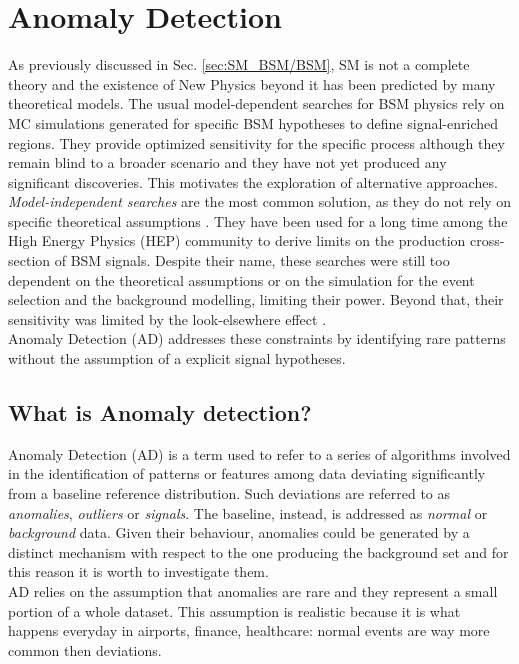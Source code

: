 \chapter{Anomaly Detection} \label{chap:AD}

As previously discussed in Sec. \ref{sec:SM_BSM/BSM}, SM is not a complete theory and the existence of New Physics beyond it has been predicted by many theoretical models.
The usual model-dependent searches for BSM physics rely on MC simulations generated for specific BSM hypotheses to define signal-enriched regions.
They provide optimized sensitivity for the specific process although they remain blind to a broader scenario and they have not yet produced any significant discoveries.
This motivates the exploration of alternative approaches.\\
\textit{Model-independent searches} are the most common solution, as they do not rely on specific theoretical assumptions \cite{LHCOlympics}. 
They have been used for a long time among the High Energy Physics (HEP) community to derive limits on the production cross-section of BSM signals. 
Despite their name, these searches were still too dependent on the theoretical assumptions or on the simulation for the event selection and the background modelling, limiting their power.
Beyond that, their sensitivity was limited by the look-elsewhere effect \cite{LEE_HEP}.\\
Anomaly Detection (AD) addresses these constraints by identifying rare patterns without the assumption of a explicit signal hypotheses.



\section{What is Anomaly detection?}\label{sec:AD/WhatsAD}
Anomaly Detection (AD) \cite{AD_survey,DLforAD} is a term used to refer to a series of algorithms involved in the identification of patterns or features among data deviating significantly from a baseline reference distribution. 
Such deviations are referred to as \textit{anomalies}, \textit{outliers} or \textit{signals}. The baseline, instead, is addressed as \textit{normal} or \textit{background} data.
Given their behaviour, anomalies could be generated by a distinct mechanism with respect to the one producing the background set and for this reason it is worth to investigate them.\\
AD relies on the assumption that anomalies are rare and they represent a small portion of a whole dataset. 
This assumption is realistic because it is what happens everyday in airports, finance, healthcare: normal events are way more common then deviations.


